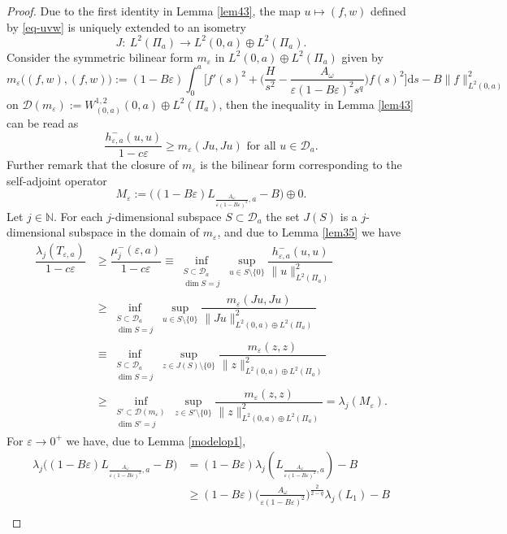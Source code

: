 \documentclass[11pt,oneside,reqno,a4paper]{amsart}
\newcommand{\dd}{\mathrm{d}}
\newcommand{\cD}{\mathcal{D}}
\newcommand{\N}{\mathbb{N}}
\newcommand{\eps}{\varepsilon}
\theoremstyle{definition}
\begin{document}
\begin{proof}
	Due to the first identity in Lemma \ref{lem43}, the map $u\mapsto (f,w)$ defined by \eqref{eq-uvw} is uniquely extended to an isometry
	\[
	J:\ L^2(\Pi_a)\to L^2(0,a)\oplus L^2(\Pi_a).
	\]
	Consider the symmetric bilinear form $m_\eps$ in  $L^2(0,a)\oplus L^2(\Pi_a)$ given by
\[
m_\eps\big((f,w),(f,w)\big):=(1-B\eps)\int_0^a\bigg[f'(s)^2  +\bigg(\dfrac{H}{s^2}
-\dfrac{A_\omega}{\eps (1-B\eps)^2 s^q}\bigg)	f(s)^2	\bigg]\dd s
-B\|f\|^2_{L^2(0,a)}
\]	
on $\cD(m_\eps):=W^{1,2}_{(0,a)}(0,a)\oplus L^2(\Pi_a)$,
then the inequality in Lemma \ref{lem43} can be read as
\[
\dfrac{h^-_{\eps,a}(u,u)}{1-c\eps}\ge m_\eps(Ju,Ju) \text{ for all }u\in \cD_a.
\]	
Further remark that the closure of $m_\eps$ is the bilinear form corresponding to the self-adjoint operator
\[
M_\eps:= \Big((1-B\eps)L_{\frac{A_\omega}{\eps (1-B\eps)^2},a}-B\Big)\oplus 0.
\]
Let $j\in\N$. For each $j$-dimensional subspace $S\subset \cD_a$ the set $J(S)$ is a $j$-dimensional subspace in the domain of $m_\eps$, and due to Lemma \ref{lem35} we have
\begin{equation}
	  \label{meps}
\begin{aligned}
\dfrac{\lambda_j(T_{\eps,a})}{1-c\eps}&\ge \dfrac{\mu^-_j(\eps,a)}{1-c\eps}
\equiv \inf_{\substack{S\subset\cD_a\\ \dim S=j}}\sup_{u\in S\setminus\{0\}}\dfrac{h^-_{\eps,a}(u,u)}{\|u\|^2_{L^2(\Pi_a)}}\\
&\ge \inf_{\substack{S\subset\cD_a\\ \dim S=j}}\sup_{u\in S\setminus\{0\}}\dfrac{m_\eps(Ju,Ju)}{\|Ju\|^2_{ L^2(0,a)\oplus L^2(\Pi_a)}}\\
&\equiv \inf_{\substack{S\subset\cD_a\\ \dim S=j}}\sup_{z\in J(S)\setminus\{0\}}\dfrac{m_\eps(z,z)}{\|z\|^2_{ L^2(0,a)\oplus L^2(\Pi_a)}}\\
&\ge \inf_{\substack{S'\subset\cD(m_\eps)\\ \dim S'=j}}\sup_{z\in S'\setminus\{0\}}\dfrac{m_\eps(z,z)}{\|z\|^2_{ L^2(0,a)\oplus L^2(\Pi_a)}}=\lambda_j(M_\eps).
\end{aligned}
\end{equation}
For $\eps\to 0^+$ we have, due to Lemma \ref{modelop1},
\begin{align*}
	\lambda_j\Big((1-B\eps)L_{\frac{A_\omega}{\eps (1-B\eps)^2},a}-B\Big)&
	=(1-B\eps)\lambda_j(L_{\frac{A_\omega}{\eps (1-B\eps)^2},a})-B\\
	&\ge(1-B\eps) \Big(\frac{A_\omega}{\eps (1-B\eps)^2}\Big)^\frac{2}{2-q}\lambda_j(L_1)-B\\

\end{align*}
\end{proof}
\end{document}
